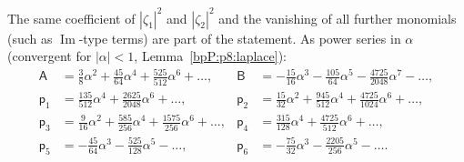 \begin{proposition}
The same coefficient of $|\zeta_1|^2$ and $|\zeta_2|^2$ and the vanishing of all further monomials (such as $\operatorname{Im}$-type terms) are part of the statement. As power series in $\alpha$ (convergent for $|\alpha|<1$, Lemma~\ref{bpP:p8:laplace}):
\begin{equation}\label{bpP:p11b:eq:series}
\begin{aligned}
\mathsf A&=\tfrac38\alpha^2+\tfrac{45}{64}\alpha^4+\tfrac{525}{512}\alpha^6+\dots,&\mathsf B&=-\tfrac{15}{16}\alpha^3-\tfrac{105}{64}\alpha^5-\tfrac{4725}{2048}\alpha^7-\dots,\\
\mathsf p_1&=\tfrac{135}{512}\alpha^4+\tfrac{2625}{2048}\alpha^6+\dots,&\mathsf p_2&=\tfrac{15}{32}\alpha^2+\tfrac{945}{512}\alpha^4+\tfrac{4725}{1024}\alpha^6+\dots,\\
\mathsf p_3&=\tfrac9{16}\alpha^2+\tfrac{585}{256}\alpha^4+\tfrac{1575}{256}\alpha^6+\dots,&\mathsf p_4&=\tfrac{315}{128}\alpha^4+\tfrac{4725}{512}\alpha^6+\dots,\\
\mathsf p_5&=-\tfrac{45}{64}\alpha^3-\tfrac{525}{128}\alpha^5-\dots,&\mathsf p_6&=-\tfrac{75}{32}\alpha^3-\tfrac{2205}{256}\alpha^5-\dots.
\end{aligned}
\end{equation}
\end{proposition}
